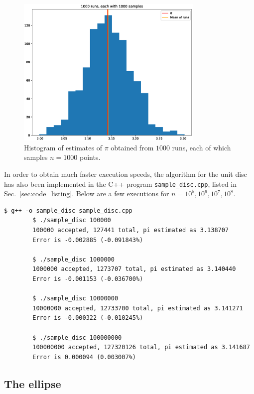 \documentclass[10pt]{article}
\begin{document}
    \begin{figure}[H]
    \begin{center}
        \includegraphics[width=0.8\textwidth]{./runs_hist.eps}
    \end{center}
    \vspace{-4em}
    \caption{Histogram of estimates of $\pi$ obtained from $1000$ runs, each of which
    samples $n = 1000$ points.}
    \end{figure}


    In order to obtain much faster execution speeds, the algorithm for the unit disc
    has also been implemented in the C++ program \texttt{sample\_disc.cpp}, listed in
    Sec.~\ref{sec:code_listing}. Below are a few executions for $n = 10^5, 10^6,
    10^7, 10^8$.
    
    \begin{lstlisting}[numbers=none, basicstyle=\ttfamily]
        $ g++ -o sample_disc sample_disc.cpp
        $ ./sample_disc 100000
        100000 accepted, 127441 total, pi estimated as 3.138707
        Error is -0.002885 (-0.091843%)
        
        $ ./sample_disc 1000000
        1000000 accepted, 1273707 total, pi estimated as 3.140440
        Error is -0.001153 (-0.036700%)

        $ ./sample_disc 10000000
        10000000 accepted, 12733700 total, pi estimated as 3.141271
        Error is -0.000322 (-0.010245%)
        
        $ ./sample_disc 100000000
        100000000 accepted, 127320126 total, pi estimated as 3.141687
        Error is 0.000094 (0.003007%)
    \end{lstlisting}


    \subsection{The ellipse}
    
\end{document}

